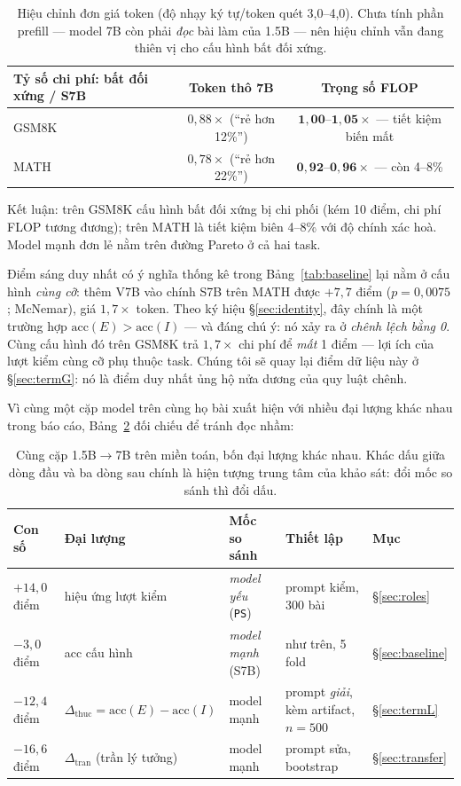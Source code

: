 \documentclass[11pt,a4paper]{article}
\newcommand{\dceil}{\Delta_{\mathrm{tran}}}
\newcommand{\dhonest}{\Delta_{\mathrm{thuc}}}
\newcommand{\acc}{\mathrm{acc}}
\begin{document}
\begin{table}[t]\centering\small
\begin{tabular}{lcc}\toprule
Tỷ số chi phí: bất đối xứng / S7B & Token thô 7B & Trọng số FLOP\\\midrule
GSM8K & $0{,}88\times$ (``rẻ hơn 12\%'') & $\mathbf{1{,}00\text{--}1{,}05\times}$ --- tiết kiệm biến mất\\
MATH & $0{,}78\times$ (``rẻ hơn 22\%'') & $\mathbf{0{,}92\text{--}0{,}96\times}$ --- còn 4--8\%\\\bottomrule
\end{tabular}
\caption{Hiệu chỉnh đơn giá token (độ nhạy ký tự/token quét 3,0--4,0). Chưa tính phần prefill
--- model 7B còn phải \emph{đọc} bài làm của 1.5B --- nên hiệu chỉnh vẫn đang thiên vị cho cấu
hình bất đối xứng.}
\label{tab:flop}
\end{table}

Kết luận: trên GSM8K cấu hình bất đối xứng bị chi phối (kém 10 điểm, chi phí FLOP tương đương);
trên MATH là tiết kiệm biên 4--8\% với độ chính xác hoà. Model mạnh đơn lẻ nằm trên đường
Pareto ở cả hai task.

Điểm sáng duy nhất có ý nghĩa thống kê trong Bảng~\ref{tab:baseline} lại nằm ở cấu hình
\emph{cùng cỡ}: thêm V7B vào chính S7B trên MATH được $+7{,}7$ điểm ($p=0{,}0075$; McNemar),
giá $1{,}7\times$ token. Theo ký hiệu \S\ref{sec:identity}, đây chính là một trường hợp
$\acc(E) > \acc(I)$ --- và đáng chú ý: nó xảy ra ở \emph{chênh lệch bằng 0}. Cùng cấu hình đó
trên GSM8K trả $1{,}7\times$ chi phí để \emph{mất} 1 điểm --- lợi ích của lượt kiểm cùng cỡ phụ
thuộc task. Chúng tôi sẽ quay lại điểm dữ liệu này ở \S\ref{sec:termG}: nó là điểm duy nhất
ủng hộ nửa dương của quy luật chênh.

Vì cùng một cặp model trên cùng họ bài xuất hiện với nhiều đại lượng khác nhau trong báo cáo,
Bảng~\ref{tab:doichieu} đối chiếu để tránh đọc nhầm:

\begin{table}[t]\centering\small
\begin{tabular}{lllll}\toprule
Con số & Đại lượng & Mốc so sánh & Thiết lập & Mục\\\midrule
$+14{,}0$ điểm & hiệu ứng lượt kiểm & \emph{model yếu} (\texttt{PS}) & prompt kiểm, 300 bài & \S\ref{sec:roles}\\
$-3{,}0$ điểm & acc cấu hình & \emph{model mạnh} (S7B) & như trên, 5 fold & \S\ref{sec:baseline}\\
$-12{,}4$ điểm & $\dhonest = \acc(E)-\acc(I)$ & model mạnh & prompt \emph{giải}, kèm artifact, $n{=}500$ & \S\ref{sec:termL}\\
$-16{,}6$ điểm & $\dceil$ (trần lý tưởng) & model mạnh & prompt sửa, bootstrap & \S\ref{sec:transfer}\\\bottomrule
\end{tabular}
\caption{Cùng cặp 1.5B$\to$7B trên miền toán, bốn đại lượng khác nhau. Khác dấu giữa dòng đầu
và ba dòng sau chính là hiện tượng trung tâm của khảo sát: đổi mốc so sánh thì đổi dấu.}
\label{tab:doichieu}
\end{table}
\end{document}
